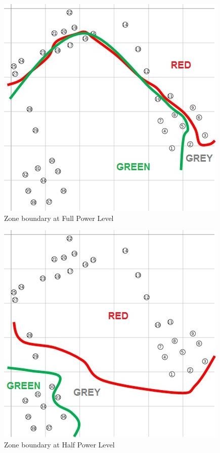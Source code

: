 \documentclass{CRPITStyle}
\begin{document}
\begin{figure}[tbph!]
	\centering
        \includegraphics[width=.9\linewidth]{Owheo_full}
        \caption{Zone boundary at Full Power Level}
        \label{subfig:owheo_full}
\end{figure}

\begin{figure}[tbph!]
	\centering
        \includegraphics[width=.9\linewidth]{Owheo_half}
        \caption{Zone boundary at Half Power Level}
        \label{subfig:owheo_half}
\end{figure}
\end{document}
